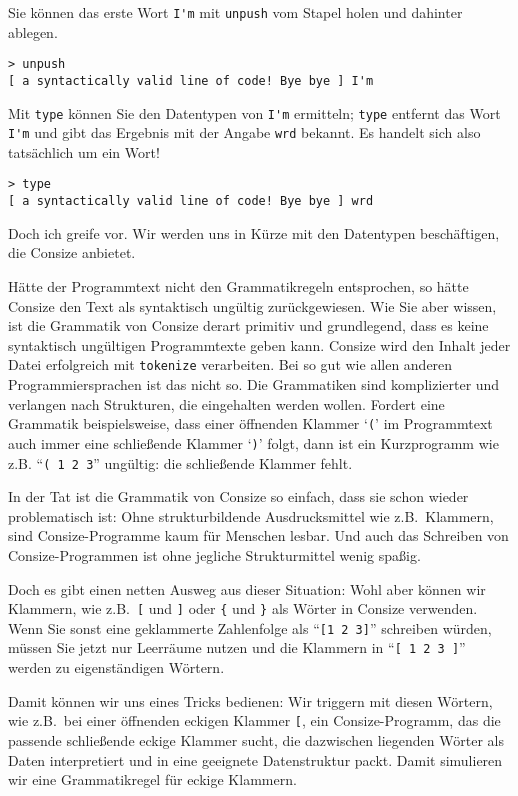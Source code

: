 Sie können das erste Wort \verb|I'm| mit \verb|unpush| vom Stapel holen und dahinter ablegen.

\begin{verbatim}
> unpush
[ a syntactically valid line of code! Bye bye ] I'm
\end{verbatim}

Mit \verb|type| können Sie den Datentypen von \verb|I'm| ermitteln; \verb|type| entfernt das Wort \verb|I'm| und gibt das Ergebnis mit der Angabe \verb|wrd| bekannt. Es handelt sich also tatsächlich um ein Wort!

\begin{verbatim}
> type
[ a syntactically valid line of code! Bye bye ] wrd
\end{verbatim}

Doch ich greife vor. Wir werden uns in Kürze mit den Datentypen be\-schäf\-ti\-gen, die Consize anbietet.

Hätte der Programmtext nicht den Grammatikregeln entsprochen, so hätte Consize den Text als syntaktisch ungültig zurückgewiesen. Wie Sie aber wissen, ist die Grammatik von Consize derart primitiv und grundlegend, dass es keine syntaktisch ungültigen Programmtexte geben kann. Consize wird den Inhalt jeder Datei erfolgreich mit \verb|tokenize| verarbeiten. Bei so gut wie allen anderen Programmiersprachen ist das nicht so. Die Grammatiken sind komplizierter und verlangen nach Strukturen, die eingehalten werden wollen. Fordert eine Grammatik beispielsweise, dass einer öffnenden Klammer `\verb|(|' im Programmtext auch immer eine schließende Klammer `\verb|)|' folgt, dann ist ein Kurzprogramm wie z.B. "`\verb|( 1 2 3|"' ungültig: die schließende Klammer fehlt.

In der Tat ist die Grammatik von Consize so einfach, dass sie schon wieder problematisch ist: Ohne strukturbildende Ausdrucksmittel wie z.B.\ Klammern, sind Consize-Programme kaum für Menschen lesbar. Und auch das Schreiben von Consize-Programmen ist ohne jegliche Strukturmittel wenig spaßig.

Doch es gibt einen netten Ausweg aus dieser Situation: Wohl aber können wir Klammern, wie z.B.\ \verb|[| und \verb|]| oder \verb|{| und \verb|}| als Wörter in Consize verwenden. Wenn Sie sonst eine geklammerte Zahlenfolge als "`\verb|[1 2 3]|"' schreiben würden, müssen Sie jetzt nur Leerräume nutzen und die Klammern in "`\verb|[ 1 2 3 ]|"' werden zu eigenständigen Wörtern.

Damit können wir uns eines Tricks bedienen: Wir triggern mit diesen Wörtern, wie z.B.\ bei einer öffnenden eckigen Klammer \verb|[|, ein Consize-Programm, das die passende schließende eckige Klammer sucht, die dazwischen liegenden Wörter als Daten interpretiert und in eine geeignete Datenstruktur packt. Damit simulieren wir eine Grammatikregel für eckige Klammern.

